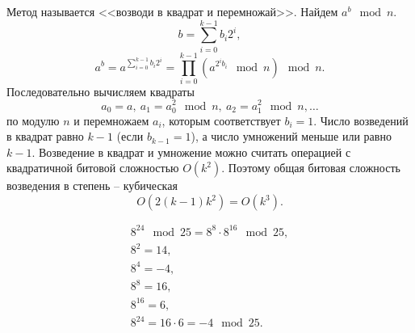 Метод называется <<возводи в квадрат и перемножай>>. Найдем $a^b \mod n$.
    \[ b = \sum_{i=0}^{k-1} b_i 2^i, \]
    \[ a^b = a^{\sum\limits_{i=0}^{k-1} b_i 2^i} = \prod_{i=0}^{k-1} (a^{{2^i} b_i} \mod n) \mod n. \]
Последовательно вычисляем квадраты
    \[ a_0 = a, ~ a_1 = a_0^2 \mod n, ~ a_2 = a_1^2 \mod n,  \ldots  \]
по модулю $n$ и перемножаем $a_i$, которым соответствует $b_i = 1$. Число возведений в квадрат равно $k-1$ (если $b_{k-1} =1$), а число умножений меньше или равно $k-1$. Возведение в квадрат и умножение можно считать операцией с квадратичной битовой сложностью $O(k^2)$. Поэтому общая битовая сложность возведения в степень -- кубическая
    \[ O(2(k-1)k^2) = O(k^3). \]

\example
\[ \begin{array}{l}
    8^{24} \mod 25 = 8^8 \cdot 8^{16} \mod 25, \\
    8^2 = 14, \\
    8^4 = -4, \\
    8^8 = 16, \\
    8^{16} = 6, \\
    8^{24} = 16 \cdot 6 = -4 \mod 25.
\end{array} \]
\exampleend
